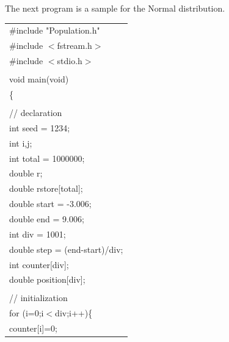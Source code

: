 \vspace*{5mm}

\noindent
The next program is a sample for the Normal distribution.

\clearpage

{\footnotesize
\begin{center}
\begin{tabular}{|l|}\hline
\#include "Population.h"\\
\#include $<$fstream.h$>$\\
\#include $<$stdio.h$>$\\
\hspace*{\textwidth}\\
void main(void)\\
\{\\
\\
\hspace*{10mm}// declaration\\
\hspace*{10mm}int seed      = 1234;\\
\hspace*{10mm}int i,j;\\
\hspace*{10mm}int total     = 1000000;\\
\hspace*{10mm}double r;\\
\hspace*{10mm}double rstore[total];\\
\hspace*{10mm}double start  = -3.006;\\
\hspace*{10mm}double end    =  9.006;\\
\hspace*{10mm}int div       =   1001;\\
\hspace*{10mm}double step   = (end-start)/div;\\
\hspace*{10mm}int counter[div];\\
\hspace*{10mm}double position[div];\\
\\
\hspace*{10mm}// initialization\\
\hspace*{10mm}for (i=0;i$<$div;i++)\{\\
\hspace*{20mm}counter[i]=0;\\

\end{tabular}
\end{center}}
